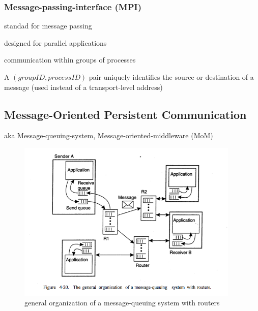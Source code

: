\documentclass[ngerman,a4paper]{report}
\begin{document}
\subsubsection{Message-passing-interface (MPI)}
\begin{compactitem}
	\item standad for message passing
	\item designed for parallel applications
	\item communication within groups of processes
	\item A $(groupID, processID)$ pair uniquely identifies the source or destination of a message (used instead of a transport-level address)
\end{compactitem}

\subsection{Message-Oriented Persistent Communication}

aka Message-queuing-system, Message-oriented-middleware (MoM) \\

\begin{figure}[h]
	\centering
	\includegraphics[width=400px]{gfx/mom.png}
	\caption{general organization of a message-queuing system with routers}
	\label{img:mom}
\end{figure}
\end{document}
